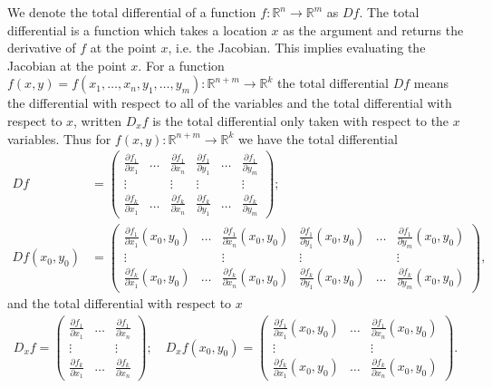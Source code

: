 \begin{remark}
	We denote the total differential of a function $f:\mathbb{R}^{n}\to \mathbb{R}^{m}$ as $Df$. The total differential is a function which takes a location $x$ as the argument and returns the derivative of $f$ at the point $x$, i.e. the Jacobian. This implies evaluating the Jacobian at the point $x$. For a function  $f(x,y)= f(x_1, \ldots, x_n, y_1, \ldots, y_m):\mathbb{R}^{n+m} \to \mathbb{R}^{k}$ the total differential $Df$ means the differential with respect to all of the variables and the total differential with respect to $x$, written $D_xf$ is the total differential only taken with respect to the $x$ variables. Thus for $f(x,y): \mathbb{R}^{n+m} \to \mathbb{R}^{k}$ we have the total differential
	\begin{align}
		Df &= 
		\begin{pmatrix}
			\frac{\partial f_1}{\partial x_1} & \ldots & \frac{\partial f_1}{\partial x_n} &\frac{\partial f_1}{\partial y_1} &\ldots &\frac{\partial f_1}{\partial y_m}\\
			\vdots & & \vdots & \vdots && \vdots \\
			\frac{\partial f_k}{\partial x_1} & \ldots & \frac{\partial f_k}{\partial x_n} &\frac{\partial f_k}{\partial y_1} & \ldots &\frac{\partial f_k}{\partial y_m} 
		\end{pmatrix};\\[8pt]
		Df(x_0, y_0) &= 
		\begin{pmatrix}
			\frac{\partial f_1}{\partial x_1}(x_0,y_0) & \ldots & \frac{\partial f_1}{\partial x_n} (x_0,y_0) &\frac{\partial f_1}{\partial y_1}(x_0,y_0)  &\ldots &\frac{\partial f_1}{\partial y_m}(x_0,y_0) \\
			\vdots & & \vdots & \vdots && \vdots \\
			\frac{\partial f_k}{\partial x_1}(x_0,y_0)  & \ldots & \frac{\partial f_k}{\partial x_n}(x_0,y_0)  &\frac{\partial f_k}{\partial y_1}(x_0,y_0)  & \ldots &\frac{\partial f_k}{\partial y_m}(x_0,y_0)  
		\end{pmatrix},
	\end{align}
and the total differential with respect to $x$
\begin{align}
		D_x f = 
		\begin{pmatrix}
			\frac{\partial f_1}{\partial x_1} & \ldots & \frac{\partial f_1}{\partial x_n} \\
			\vdots & & \vdots \\
			\frac{\partial f_k}{\partial x_1} & \ldots & \frac{\partial f_k}{\partial x_n} 
		\end{pmatrix};\quad
		D_xf(x_0, y_0) = 
		\begin{pmatrix}
			\frac{\partial f_1}{\partial x_1}(x_0,y_0) & \ldots & \frac{\partial f_1}{\partial x_n} (x_0,y_0)\\
			\vdots & & \vdots \\
			\frac{\partial f_k}{\partial x_1}(x_0,y_0)  & \ldots & \frac{\partial f_k}{\partial x_n}(x_0,y_0) 
		\end{pmatrix}.
\end{align}
\end{remark}
